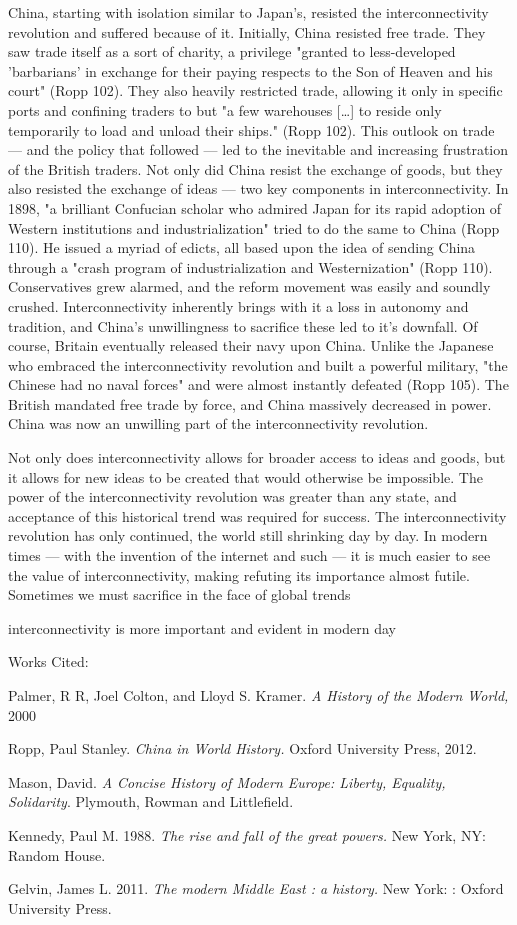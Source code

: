 \documentclass[letterpaper]{article}
\begin{document}
China, starting with isolation similar to Japan's, resisted the
interconnectivity revolution and suffered because of it. Initially,
China resisted free trade. They saw trade itself as a sort of charity, a
privilege "granted to less-developed 'barbarians' in exchange for their
paying respects to the Son of Heaven and his court" (Ropp 102). They
also heavily restricted trade, allowing it only in specific ports and
confining traders to but "a few warehouses [\ldots{}] to reside only
temporarily to load and unload their ships." (Ropp 102). This outlook on
trade --- and the policy that followed --- led to the inevitable and
increasing frustration of the British traders. Not only did China resist
the exchange of goods, but they also resisted the exchange of ideas ---
two key components in interconnectivity. In 1898, "a brilliant Confucian
scholar who admired Japan for its rapid adoption of Western institutions
and industrialization" tried to do the same to China (Ropp 110). He
issued a myriad of edicts, all based upon the idea of sending China
through a "crash program of industrialization and Westernization" (Ropp
110). Conservatives grew alarmed, and the reform movement was easily and
soundly crushed. Interconnectivity inherently brings with it a loss in
autonomy and tradition, and China's unwillingness to sacrifice these led
to it's downfall. Of course, Britain eventually released their navy upon
China. Unlike the Japanese who embraced the interconnectivity revolution
and built a powerful military, "the Chinese had no naval forces" and
were almost instantly defeated (Ropp 105). The British mandated free
trade by force, and China massively decreased in power. China was now an
unwilling part of the interconnectivity revolution.

Not only does interconnectivity allows for broader access to ideas and
goods, but it allows for new ideas to be created that would otherwise be
impossible. The power of the interconnectivity revolution was greater
than any state, and acceptance of this historical trend was required for
success. The interconnectivity revolution has only continued, the world
still shrinking day by day. In modern times --- with the invention of
the internet and such --- it is much easier to see the value of
interconnectivity, making refuting its importance almost futile.
Sometimes we must sacrifice in the face of global trends

interconnectivity is more important and evident in modern day

Works Cited:

Palmer, R R, Joel Colton, and Lloyd S. Kramer. \emph{A History of the Modern
World,} 2000

Ropp, Paul Stanley. \emph{China in World History.} Oxford University
Press, 2012.

Mason, David. \emph{A Concise History of Modern Europe: Liberty, Equality,
Solidarity}. Plymouth, Rowman and Littlefield.

Kennedy, Paul M. 1988. \emph{The rise and fall of the great powers.} New
York, NY: Random House.

Gelvin, James L. 2011. \emph{The modern Middle East : a history.} New York: :
Oxford University Press.
\end{document}
